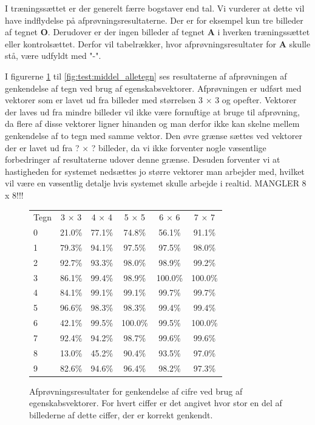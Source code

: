 I træningssættet er der generelt færre bogstaver end tal. Vi vurderer at dette vil have indflydelse på afprøvningsresultaterne. Der er for eksempel kun tre billeder af tegnet \textbf{O}. Derudover er der ingen billeder af tegnet \textbf{A} i hverken træningssættet eller kontrolsættet. Derfor vil tabelrækker, hvor afprøvningsresultater for \textbf{A} skulle stå, være udfyldt med "-".


I figurerne \ref{fig:test:middel_tal} til \ref{fig:test:middel_alletegn} ses resultaterne af afprøvningen af genkendelse af tegn ved brug af egenskabsvektorer. Afprøvningen er udført med vektorer som er lavet ud fra billeder med størrelsen 3 $\times$ 3 og opefter. Vektorer der laves ud fra mindre billeder vil ikke være fornuftige at bruge til afprøvning, da flere af disse vektorer ligner hinanden og man derfor ikke kan skelne mellem genkendelse af to tegn med samme vektor. Den øvre grænse sættes ved vektorer der er lavet ud fra ? $\times$ ? billeder, da vi ikke forventer nogle væsentlige forbedringer af resultaterne udover denne grænse. Desuden forventer vi at hastigheden for systemet nedsættes jo større vektorer man arbejder med, hvilket vil være en væsentlig detalje hvis systemet skulle arbejde i realtid. MANGLER 8 x 8!!!

\begin{figure}[htp]
\centering
\begin{tabular}{|l|c|c|c|c|c|}\hline
\rowcolor[gray]{0.9} \multicolumn{6}{|>{\columncolor[gray]{0.9}}c|}{\textbf{Genkendelse af cifre - Egenskabsvektor}} \\ \hline
Tegn & 3 $\times$ 3 & 4 $\times$ 4 & 5 $\times$ 5 & 6 $\times$ 6 & 7 $\times$ 7\\\hline
0 & 21.0\% & 77.1\% & 74.8\% & 56.1\% & 91.1\%\\\hline
1 & 79.3\% & 94.1\% & 97.5\% & 97.5\% & 98.0\%\\\hline
2 & 92.7\% & 93.3\% & 98.0\% & 98.9\% & 99.2\%\\\hline
3 & 86.1\% & 99.4\% & 98.9\% & 100.0\% & 100.0\%\\\hline
4 & 84.1\% & 99.1\% & 99.1\% & 99.7\% & 99.7\%\\\hline
5 & 96.6\% & 98.3\% & 98.3\% & 99.4\% & 99.4\%\\\hline
6 & 42.1\% & 99.5\% & 100.0\% & 99.5\% & 100.0\%\\\hline
7 & 92.4\% & 94.2\% & 98.7\% & 99.6\% & 99.6\%\\\hline
8 & 13.0\% & 45.2\% & 90.4\% & 93.5\% & 97.0\%\\\hline
9 & 82.6\% & 94.6\% & 96.4\% & 98.2\% & 97.3\%\\\hline
\end{tabular}
\caption{Afprøvningsresultater for genkendelse af cifre ved brug af egenskabsvektorer. For hvert ciffer er det angivet hvor stor en del af billederne af dette ciffer, der er korrekt genkendt.}
\label{fig:test:middel_tal}
\end{figure}

